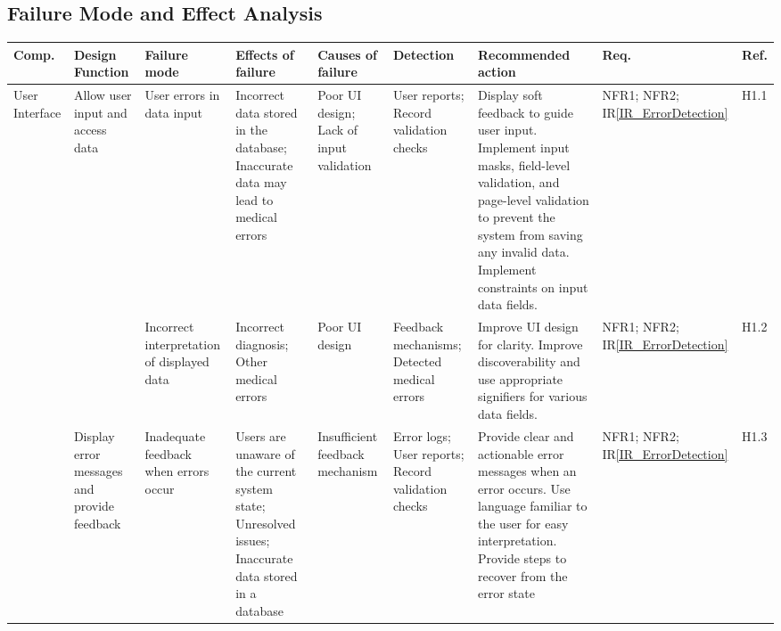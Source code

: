 \documentclass{article}
\begin{document}
\begin{landscape} 

\section{Failure Mode and Effect Analysis}
    
    \begin{longtable}{|p{1.5cm}|p{2cm}|p{2.6cm}|p{2cm}|p{2cm}|p{2cm}|p{3.5cm}|p{1cm}|p{0.8cm}|}
        \toprule
        \textbf{Comp.} & \textbf{Design Function} & \textbf{Failure mode} & \textbf{Effects of failure} & \textbf{Causes of failure} & \textbf{Detection} & \textbf{Recommended action} & \textbf{Req.} & \textbf{Ref.}\\ 
        \midrule
        User Interface & \raggedright Allow user input and access data & \raggedright User errors in data input & \raggedright Incorrect data stored in the database; Inaccurate data may lead to medical errors & \raggedright Poor UI design; Lack of input validation & \raggedright User reports; Record validation checks & \raggedright Display soft feedback to guide user input. Implement input masks, field-level validation, and page-level validation to prevent the system from saving any invalid data. Implement constraints on input data fields. & NFR1; NFR2; IR\ref{IR_ErrorDetection} & H1.1 \\ 
        \midrule
        & & \raggedright Incorrect interpretation of displayed data & \raggedright Incorrect diagnosis; Other medical errors & \raggedright Poor UI design & \raggedright Feedback mechanisms; Detected medical errors & \raggedright Improve UI design for clarity. Improve discoverability and use appropriate signifiers for various data fields. & NFR1; NFR2; IR\ref{IR_ErrorDetection} & H1.2 \\ 
        \midrule
        & \raggedright Display error messages and provide feedback & \raggedright Inadequate feedback when errors occur & \raggedright Users are unaware of the current system state; Unresolved issues; Inaccurate data stored in a database & \raggedright Insufficient feedback mechanism & \raggedright Error logs; User reports; Record validation checks & \raggedright Provide clear and actionable error messages when an error occurs. Use language familiar to the user for easy interpretation. Provide steps to recover from the error state & NFR1; NFR2; IR\ref{IR_ErrorDetection} & H1.3 \\
        \midrule

\end{longtable}
\end{landscape}
\end{document}

